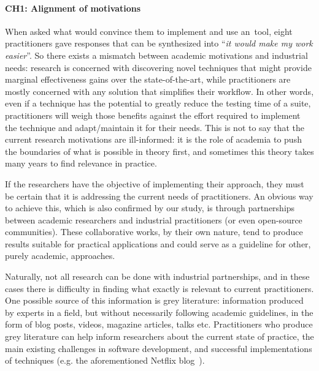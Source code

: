 \paragraph{CH1: Alignment of motivations}
When asked what would convince them to implement and use an~\rt tool, eight practitioners gave responses that can be synthesized into ``\textit{it would make my work easier}''.
So there exists a mismatch between academic motivations and industrial needs: research is concerned with discovering novel techniques that might provide marginal effectiveness gains over the state-of-the-art, while practitioners are mostly concerned with any solution that simplifies their workflow.
In other words, even if a \tcs technique has the potential to greatly reduce the testing time of a suite, practitioners will weigh those benefits against the effort required to implement the technique and adapt/maintain it for their needs.
This is not to say that the current research motivations are ill-informed: it is the role of academia to push the boundaries of what is possible in theory first, and sometimes this theory takes many years to find relevance in practice.

If the researchers have the objective of implementing their approach, they must be certain that it is addressing the current needs of practitioners.
An obvious way to achieve this, which is also confirmed by our study, is through partnerships between academic researchers and industrial practitioners (or even open-source communities).
These collaborative works, by their own nature, tend to produce results suitable for practical applications and could serve as a guideline for other, purely academic, approaches.

Naturally, not all research can be done with industrial partnerships, and in these cases there is difficulty in finding what exactly is relevant to current practitioners.
One possible source of this information is grey literature: information produced by experts in a field, but without necessarily following academic guidelines, in the form of blog posts, videos, magazine articles, talks etc.
Practitioners who produce grey literature can help inform researchers about the current state of practice, the main existing challenges in software development, and successful implementations of techniques (e.g. the aforementioned Netflix blog~\cite{netflixlerner}).



